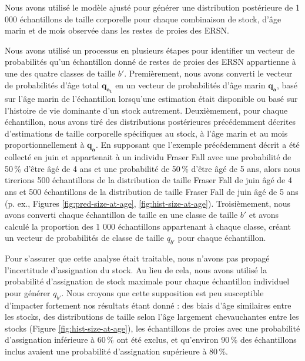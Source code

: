 Nous avons utilisé le modèle ajusté pour générer une distribution postérieure de 1 000 échantillons de taille corporelle pour chaque combinaison de stock, d'âge marin et de mois observée dans les restes de proies des ERSN.


Nous avons utilisé un processus en plusieurs étapes pour identifier un vecteur de probabilités qu'un échantillon donné de restes de proies des ERSN appartienne à une des quatre classes de taille $b'$. Premièrement, nous avons converti le vecteur de probabilités d'âge total $\boldsymbol{q_{a_t}}$ en un vecteur de probabilités d'âge marin $\boldsymbol{q_{a}}$, basé sur l'âge marin de l'échantillon lorsqu'une estimation était disponible ou basé sur l'histoire de vie dominante d'un stock autrement. Deuxièmement, pour chaque échantillon, nous avons tiré des distributions postérieures précédemment décrites d'estimations de taille corporelle spécifiques au stock, à l'âge marin et au mois proportionnellement à $\boldsymbol{q_{a}}$. En supposant que l'exemple précédemment décrit a été collecté en juin et appartenait à un individu Fraser Fall avec une probabilité de 50\,\% d'être âgé de 4 ans et une probabilité de 50\,\% d'être âgé de 5 ans, alors nous tirerions 500 échantillons de la distribution de taille Fraser Fall de juin âgé de 4 ans et 500 échantillons de la distribution de taille Fraser Fall de juin âgé de 5 ans (p. ex., Figures \ref{fig:pred-size-at-age}, \ref{fig:hist-size-at-age}). Troisièmement, nous avons converti chaque échantillon de taille en une classe de taille $b'$ et avons calculé la proportion des 1 000 échantillons appartenant à chaque classe, créant un vecteur de probabilités de classe de taille $q_{b'}$ pour chaque échantillon. 

Pour s'assurer que cette analyse était traitable, nous n'avons pas propagé l'incertitude d'assignation du stock. Au lieu de cela, nous avons utilisé la probabilité d'assignation de stock maximale pour chaque échantillon individuel pour générer $q_{b'}$. Nous croyons que cette supposition est peu susceptible d'impacter fortement nos résultats étant donné : des biais d'âge similaires entre les stocks, des distributions de taille selon l'âge largement chevauchantes entre les stocks (Figure \ref{fig:hist-size-at-age}), les échantillons de proies avec une probabilité d'assignation inférieure à 60\,\% ont été exclus, et qu'environ 90\,\% des échantillons inclus avaient une probabilité d'assignation supérieure à 80\,\%.